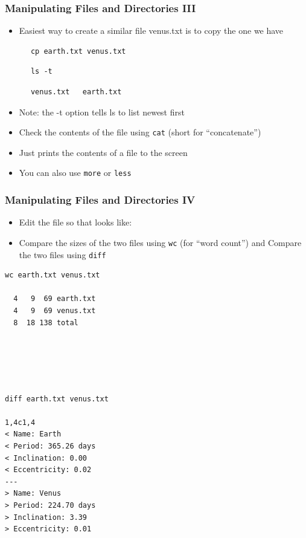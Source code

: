 \begin{frame}[fragile]\frametitle{Manipulating Files and Directories III}
\begin{itemize}
\item Easiest way to create a similar file venus.txt is to copy the one we have
\end{itemize}
\codelist
\begin{lstlisting}
      cp earth.txt venus.txt
\end{lstlisting}
\codelist
\begin{lstlisting}
      ls -t
\end{lstlisting}      
\reslist
\begin{lstlisting}
      venus.txt   earth.txt
\end{lstlisting}
\begin{itemize}      
    \item Note: the -t option tells ls to list newest first
    \item Check the contents of the file using \lstinline!cat! (short for “concatenate”)
    \item Just prints the contents of a file to the screen
    \item You can also use \lstinline!more! or \lstinline!less!
\end{itemize}	
\end{frame}

\begin{frame}[fragile]\frametitle{Manipulating Files and Directories IV}
\begin{itemize}
\item Edit the file so that looks like:
\codenormal
\item Compare the sizes of the two files using \lstinline!wc! (for “word count”) and 
Compare the two files using \lstinline!diff!
\end{itemize}
\codesmall
\reslist
\begin{multicols}{2}
\begin{lstlisting}[linewidth=5cm]
wc earth.txt venus.txt

  4   9  69 earth.txt
  4   9  69 venus.txt
  8  18 138 total
\end{lstlisting}
\mbox{}\\
\mbox{}\\
\mbox{}\\
\mbox{}\\
\begin{lstlisting}[linewidth=5cm]
diff earth.txt venus.txt

1,4c1,4
< Name: Earth
< Period: 365.26 days
< Inclination: 0.00
< Eccentricity: 0.02
---
> Name: Venus
> Period: 224.70 days
> Inclination: 3.39
> Eccentricity: 0.01
\end{lstlisting}
\end{multicols}
\end{frame}


